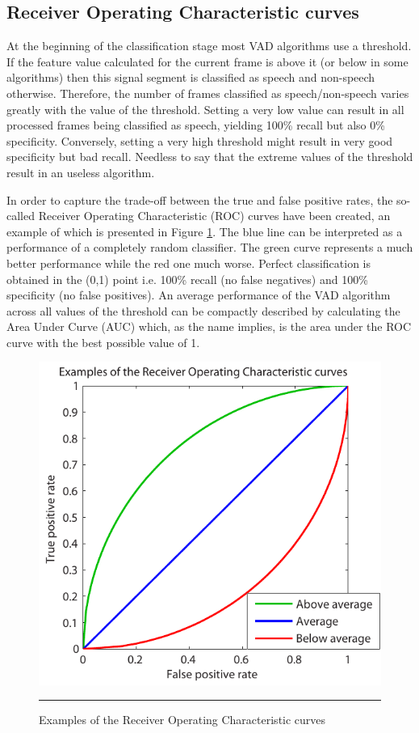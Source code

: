\subsection{Receiver Operating Characteristic curves}

At the beginning of the classification stage most VAD algorithms use a threshold. If the feature value calculated for the current frame is above it (or below in some algorithms) then this signal segment is classified as speech and non-speech otherwise. Therefore, the number of frames classified as speech/non-speech varies greatly with the value of the threshold. Setting a very low value can result in all processed frames being classified as speech, yielding 100\% recall but also 0\% specificity. Conversely, setting a very high threshold might result in very good specificity but bad recall. Needless to say that the extreme values of the threshold result in an useless algorithm.

In order to capture the trade-off between the true and false positive rates, the so-called Receiver Operating Characteristic (ROC) curves have been created, an example of which is presented in Figure \ref{fig:roc}. The blue line can be interpreted as a performance of a completely random classifier. The green curve represents a much better performance while the red one much worse. Perfect classification is obtained in the (0,1) point i.e. 100\% recall (no false negatives) and 100\% specificity (no false positives). An average performance of the VAD algorithm across all values of the threshold can be compactly described by calculating the Area Under Curve (AUC) which, as the name implies, is the area under the ROC curve with the best possible value of 1.

\begin{figure}[htbp]
	\centering
		\includegraphics[width=0.63\columnwidth]{Figures/Chapter4/roc2.pdf}
		\rule{37em}{0.5pt}
	\caption[Examples of the Receiver Operating Characteristic curves]{Examples of the Receiver Operating Characteristic curves}
	\label{fig:roc}
\end{figure}

